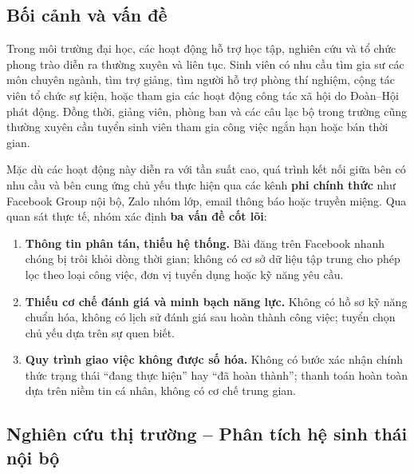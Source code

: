 
\subsection{Bối cảnh và vấn đề}

Trong môi trường đại học, các hoạt động hỗ trợ học tập, nghiên cứu và tổ chức phong trào
diễn ra thường xuyên và liên tục. Sinh viên có nhu cầu tìm gia sư các môn chuyên ngành, tìm
trợ giảng, tìm người hỗ trợ phòng thí nghiệm, cộng tác viên tổ chức sự kiện, hoặc tham gia
các hoạt động công tác xã hội do Đoàn--Hội phát động. Đồng thời, giảng viên, phòng ban và
các câu lạc bộ trong trường cũng thường xuyên cần tuyển sinh viên tham gia công việc ngắn
hạn hoặc bán thời gian.

Mặc dù các hoạt động này diễn ra với tần suất cao, quá trình kết nối giữa bên có nhu cầu và
bên cung ứng chủ yếu thực hiện qua các kênh \textbf{phi chính thức} như Facebook Group nội bộ,
Zalo nhóm lớp, email thông báo hoặc truyền miệng. Qua quan sát thực tế, nhóm xác định
\textbf{ba vấn đề cốt lõi}:

\begin{enumerate}
  \item \textbf{Thông tin phân tán, thiếu hệ thống.}
    Bài đăng trên Facebook nhanh chóng bị trôi khỏi dòng thời gian; không có cơ sở dữ liệu
    tập trung cho phép lọc theo loại công việc, đơn vị tuyển dụng hoặc kỹ năng yêu cầu.

  \item \textbf{Thiếu cơ chế đánh giá và minh bạch năng lực.}
    Không có hồ sơ kỹ năng chuẩn hóa, không có lịch sử đánh giá sau hoàn thành công việc;
    tuyển chọn chủ yếu dựa trên sự quen biết.

  \item \textbf{Quy trình giao việc không được số hóa.}
    Không có bước xác nhận chính thức trạng thái ``đang thực hiện'' hay ``đã hoàn thành'';
    thanh toán hoàn toàn dựa trên niềm tin cá nhân, không có cơ chế trung gian.
\end{enumerate}

\subsection{Nghiên cứu thị trường -- Phân tích hệ sinh thái nội bộ}

